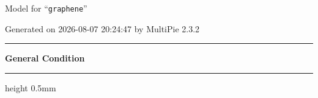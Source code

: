 \documentclass[fleqn,10pt,landscape]{jsarticle}
\begin{document}
\setcounter{MaxMatrixCols}{32}

\renewcommand{\tablename}{Table~}
\renewcommand{\figurename}{Figure~}
\setlength{\baselineskip}{16pt}
\setlength{\parindent}{0pt}
\setlength{\mathindent}{0pt}
\footnotesize
\begin{center}
\LARGE
Model for ``\texttt{graphene}''
\end{center}
\begin{flushright}
Generated on 2026-08-07 20:24:47 by MultiPie 2.3.2
\end{flushright}
\setlength{\baselineskip}{16pt}
\footnotesize
\vspace{5mm}
\noindent \rule[0.5mm]{5mm}{0.5mm}\hspace{3mm}\textbf{General Condition}\hspace{3mm}\leaders\hrule height 0.5mm\hfill\kern0pt
\vspace{3mm}
\end{document}
